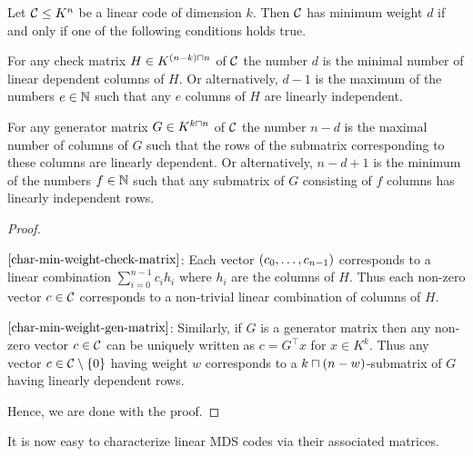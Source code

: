 \begin{lemma}\label{char-min-weight-matrices}
    Let $\mathcal{C}\leq K^n$ be a linear code of dimension $k$. Then $\mathcal{C}$ has minimum weight $d$ if and only if one of the following conditions holds true.
    \begin{statements}
            \item\label{char-min-weight-check-matrix} For any check matrix $H\in K^{(n-k)\setprod n}$ of $\mathcal{C}$ the number $d$ is the minimal number of linear dependent columns of $H$. Or alternatively, $d-1$ is the maximum of the numbers $e\in\mathbb{N}$ such that any $e$ columns of $H$ are linearly independent.
            \item\label{char-min-weight-gen-matrix} For any generator matrix $G\in K^{k\setprod n}$ of $\mathcal{C}$ the number $n-d$ is the maximal number of columns of $G$ such that the rows of the submatrix corresponding to these columns are linearly dependent. Or alternatively, $n-d+1$ is the minimum of the numbers $f\in\mathbb{N}$ such that any submatrix of $G$ consisting of $f$ columns has linearly independent rows.
    \end{statements}
\end{lemma}

\begin{proof}
    \begin{implications}
            \item[$\autoref{char-min-weight-check-matrix}$:] Each vector $\seq{\range{c_0}{c_{n-1}}}$ corresponds to a linear combination $\sum_{i=0}^{n-1}{c_i h_i}$ where $h_i$ are the columns of $H$. Thus each non-zero vector $c\in\mathcal{C}$ corresponds to a non-trivial linear combination of columns of $H$.

            \item[$\autoref{char-min-weight-gen-matrix}$:] Similarly, if $G$ is a generator matrix then any non-zero vector $c\in\mathcal{C}$ can be uniquely written as $c=G^{\top} x$ for $x\in K^k$. Thus any vector $c\in\cC\setminus\set 0$ having weight $w$ corresponds to a $k\setprod (n-w)$-submatrix of $G$ having linearly dependent rows.
    \end{implications}
    Hence, we are done with the proof.
\end{proof}

It is now easy to characterize linear MDS codes via their associated matrices.

